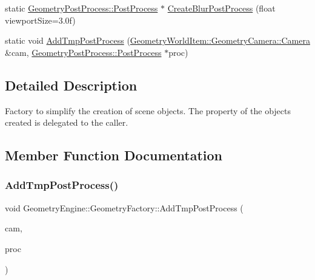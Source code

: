 \begin{DoxyCompactItemize}
\item 
static \mbox{\hyperlink{class_geometry_engine_1_1_geometry_post_process_1_1_post_process}{Geometry\+Post\+Process\+::\+Post\+Process}} $\ast$ \mbox{\hyperlink{class_geometry_engine_1_1_geometry_factory_afe48a638a03829d843c9ac22f4ba3606}{Create\+Blur\+Post\+Process}} (float viewport\+Size=3.\+0f)
\item 
static void \mbox{\hyperlink{class_geometry_engine_1_1_geometry_factory_a50fd72b5c91709daea566d8f233abb23}{Add\+Tmp\+Post\+Process}} (\mbox{\hyperlink{class_geometry_engine_1_1_geometry_world_item_1_1_geometry_camera_1_1_camera}{Geometry\+World\+Item\+::\+Geometry\+Camera\+::\+Camera}} \&cam, \mbox{\hyperlink{class_geometry_engine_1_1_geometry_post_process_1_1_post_process}{Geometry\+Post\+Process\+::\+Post\+Process}} $\ast$proc)
\end{DoxyCompactItemize}


\subsection{Detailed Description}
Factory to simplify the creation of scene objects. The property of the objects created is delegated to the caller. 

\subsection{Member Function Documentation}
\mbox{\label{class_geometry_engine_1_1_geometry_factory_a50fd72b5c91709daea566d8f233abb23}} 
\subsubsection{\texorpdfstring{AddTmpPostProcess()}{AddTmpPostProcess()}}
{\footnotesize\ttfamily void Geometry\+Engine\+::\+Geometry\+Factory\+::\+Add\+Tmp\+Post\+Process (\begin{DoxyParamCaption}\item[{\mbox{\hyperlink{class_geometry_engine_1_1_geometry_world_item_1_1_geometry_camera_1_1_camera}{Geometry\+World\+Item\+::\+Geometry\+Camera\+::\+Camera}} \&}]{cam,  }\item[{\mbox{\hyperlink{class_geometry_engine_1_1_geometry_post_process_1_1_post_process}{Geometry\+Post\+Process\+::\+Post\+Process}} $\ast$}]{proc }\end{DoxyParamCaption})\hspace{0.3cm}{\ttfamily [static]}}

